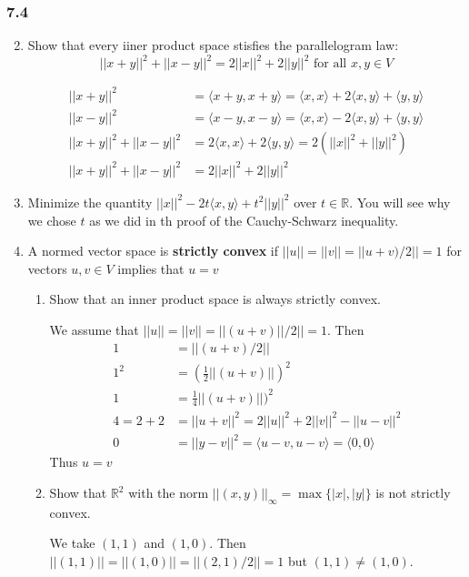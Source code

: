 \documentclass[letterpaper]{article}
\begin{document}
\subsubsection*{7.4}
\begin{enumerate}
\setcounter{enumi}{1}
\item
Show that every iiner product space stisfies the parallelogram law:
\[||x+y||^2+||x-y||^2=2||x||^2+2||y||^2\text{ for all } x,y\in V\]

  \begin{align*}
    ||x+y||^2&=\langle x+y,x+y\rangle=\langle x,x\rangle+2\langle x,y\rangle+\langle y,y\rangle\\
    ||x-y||^2&=\langle x-y,x-y\rangle=\langle x,x\rangle-2\langle x,y\rangle+\langle y,y\rangle\\
    ||x+y||^2+||x-y||^2&=2\langle x,x\rangle+2\langle y,y\rangle=2(||x||^2+||y||^2)\\
    ||x+y||^2+||x-y||^2&=2||x||^2+2||y||^2
  \end{align*}


\item
Minimize the quantity $||x||^2-2t\langle x,y\rangle +t^2||y||^2$ over $t\in \mathbb{R}$. You will see why we chose $t$ as we did in th proof of the Cauchy-Schwarz inequality.

\setcounter{enumi}{6}
\item
A normed vector space is {\bf strictly convex} if $||u||=||v||=||u+v)/2||=1$ for vectors $u,v\in V$ implies that $u=v$
\begin{enumerate}
\item
Show that an inner product space is always strictly convex.

We assume that $||u||=||v||=||(u+v)||/2||=1$. Then
\begin{align*}
  1&=||(u+v)/2||\\
  1^2&=(\frac{1}{2}||(u+v)||)^2\\
  1&=\frac{1}{4}||(u+v)||)^2\\
  4=2+2&=||u+v||^2=2||u||^2+2||v||^2-||u-v||^2\\
  0&=||y-v||^2=\langle u-v,u-v\rangle=\langle0,0\rangle
\end{align*}
Thus $u=v$
\item
Show that $\mathbb{R}^2$ with the norm $||(x,y)||_\infty=\max\{|x|,|y|\}$ is not strictly convex.

We take $(1,1)$ and $(1,0)$. Then $||(1,1)||=||(1,0)||=||(2,1)/2||=1$ but $(1,1)\ne (1,0)$.
\end{enumerate}
\end{enumerate}
\end{document}
